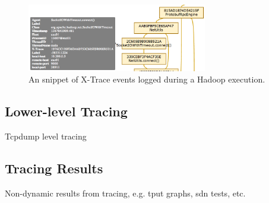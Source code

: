 \begin{figure}
\centering
\includegraphics[width=0.7\textwidth]{figures/xtrace-example2.png}
\caption{An snippet of X-Trace events logged during a Hadoop execution.}
\label{fig:xtrace}
\end{figure}

\subsection{Lower-level Tracing}
\label{ssec:low}
Tcpdump level tracing

\subsection{Tracing Results}
\label{ssec:results}
Non-dynamic results from tracing, e.g. tput graphs, sdn tests, etc.

